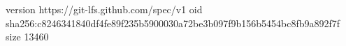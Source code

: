 version https://git-lfs.github.com/spec/v1
oid sha256:c8246341840df4fe89f235b5900030a72be3b097f9b156b5454bc8fb9a892f7f
size 13460
